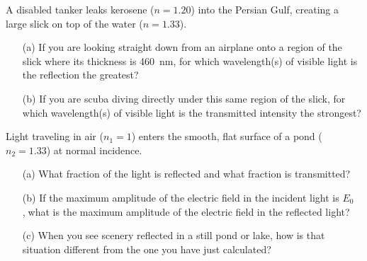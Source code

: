 \documentclass[12pt,letterpaper,boxed,cm]{hmcpset}
\begin{document}

\begin{problem}[41-E23]
A disabled tanker leaks kerosene ($n = 1.20$) into the Persian Gulf, creating a large slick on top of the water ($n = 1.33$).
\begin{enumerate}
	\item[(a)] If you are looking straight down from an airplane onto a region of the slick where its thickness is \SI{460}{nm}, for which wavelength(s) of visible light is the reflection the greatest?
	\item[(b)] If you are scuba diving directly under this same region of the slick, for which wavelength(s) of visible light is the transmitted intensity the strongest?
\end{enumerate}
\end{problem}
\begin{solution}
\end{solution}
\newpage

\begin{problem}[SUP4]
Light traveling in air ($n_1 = 1$) enters the smooth, flat surface of a pond ($n_2 = 1.33$) at normal incidence. 
\begin{enumerate}
	\item[(a)] What fraction of the light is reflected and what fraction is transmitted? 
	\item[(b)] If the maximum amplitude of the electric field in the incident light is $E_0$ ,଴what is the maximum amplitude of the electric field in the reflected light? 
	\item[(c)] When you see scenery reflected in a still pond or lake, how is that situation different from the one you have just calculated?
	\end{enumerate}
	 
\end{problem}
\begin{solution}
\end{solution}
\end{document}
